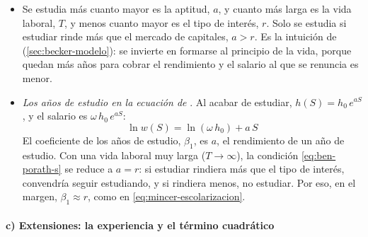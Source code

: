 \documentclass[11pt]{article}
\begin{document}
\begin{itemize}
\item Se estudia más cuanto mayor es la aptitud, $a$, y cuanto más larga es la vida laboral, $T$, y menos cuanto mayor es el tipo de interés, $r$. Solo se estudia si estudiar rinde más que el mercado de capitales, $a>r$. Es la intuición de  (\ref{sec:becker-modelo}): se invierte en formarse al principio de la vida, porque quedan más años para cobrar el rendimiento y el salario al que se renuncia es menor.
\item \emph{Los años de estudio en la ecuación de }. Al acabar de estudiar, $h(S)=h_0\,e^{aS}$, y el salario es $\omega\,h_0\,e^{aS}$:
  \[
  \ln w(S)=\ln(\omega\,h_0)+a\,S
  \]
  El coeficiente de los años de estudio, $\beta_1$, es $a$, el rendimiento de un año de estudio. Con una vida laboral muy larga ($T\to\infty$), la condición \eqref{eq:ben-porath-s} se reduce a $a=r$: si estudiar rindiera más que el tipo de interés, convendría seguir estudiando, y si rindiera menos, no estudiar. Por eso, en el margen, $\beta_1\approx r$, como en \eqref{eq:mincer-escolarizacion}.
\end{itemize}

\paragraph{c) Extensiones: la experiencia y el término cuadrático}
\end{document}

